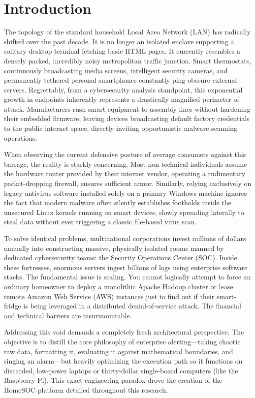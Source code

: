 \documentclass[conference]{IEEEtran}
\begin{document}
\section{Introduction}

The topology of the standard household Local Area Network (LAN) has radically shifted over the past decade. It is no longer an isolated enclave supporting a solitary desktop terminal fetching basic HTML pages. It currently resembles a densely packed, incredibly noisy metropolitan traffic junction. Smart thermostats, continuously broadcasting media screens, intelligent security cameras, and permanently tethered personal smartphones constantly ping obscure external servers. Regrettably, from a cybersecurity analysis standpoint, this exponential growth in endpoints inherently represents a drastically magnified perimeter of attack. Manufacturers rush smart equipment to assembly lines without hardening their embedded firmware, leaving devices broadcasting default factory credentials to the public internet space, directly inviting opportunistic malware scanning operations.

When observing the current defensive posture of average consumers against this barrage, the reality is starkly concerning. Most non-technical individuals assume the hardware router provided by their internet vendor, operating a rudimentary packet-dropping firewall, ensures sufficient armor. Similarly, relying exclusively on legacy antivirus software installed solely on a primary Windows machine ignores the fact that modern malware often silently establishes footholds inside the unsecured Linux kernels running on smart devices, slowly spreading laterally to steal data without ever triggering a classic file-based virus scan.

To solve identical problems, multinational corporations invest millions of dollars annually into constructing massive, physically isolated rooms manned by dedicated cybersecurity teams: the Security Operations Center (SOC). Inside these fortresses, enormous servers ingest billions of logs using enterprise software stacks. The fundamental issue is scaling. You cannot logically attempt to force an ordinary homeowner to deploy a monolithic Apache Hadoop cluster or lease remote Amazon Web Service (AWS) instances just to find out if their smart-fridge is being leveraged in a distributed denial-of-service attack. The financial and technical barriers are insurmountable.

Addressing this void demands a completely fresh architectural perspective. The objective is to distill the core philosophy of enterprise alerting—taking chaotic raw data, formatting it, evaluating it against mathematical boundaries, and ringing an alarm—but heavily optimizing the execution path so it functions on discarded, low-power laptops or thirty-dollar single-board computers (like the Raspberry Pi). This exact engineering paradox drove the creation of the HomeSOC platform detailed throughout this research. 
\end{document}

